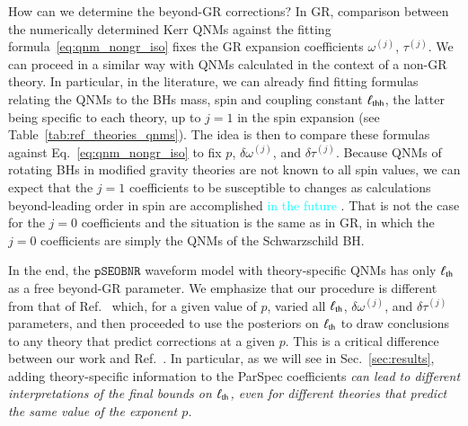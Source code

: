\documentclass[twocolumn,
               prd,
               aps,
               superscriptaddress,
               tightenlines,
               nofootinbib,
               eqsecnum,
               amsfonts,
               amsmath,
               longbibliography]{revtex4-1}
\newcommand{\pSEOB}{\texttt{pSEOBNR}}
\newcommand{\ab}[1]{{\textcolor{cyan}{{#1}} }}
\begin{document}
How can we determine the beyond-GR corrections? In GR, comparison between the numerically determined
Kerr QNMs against the fitting formula~\eqref{eq:qnm_nongr_iso} fixes the GR expansion coefficients
$\omega^{(j)}$, $\tau^{(j)}$.
%
We can proceed in a similar way with QNMs calculated in the context of a non-GR theory.
%
In particular, in the literature, we can already find fitting formulas relating
the QNMs to the BHs mass, spin and coupling constant $\ell_{\rm thh}$, the latter being
specific to each theory, up to $j=1$ in the spin expansion (see Table~\ref{tab:ref_theories_qnms}).
%
The idea is then to compare these formulas against Eq.~\eqref{eq:qnm_nongr_iso}
to fix $p$, $\delta\omega^{(j)}$, and $\delta\tau^{(j)}$.
%
Because QNMs of rotating BHs in modified gravity theories are not known to
all spin values, we can expect that the $j=1$ coefficients to be susceptible to
changes as calculations beyond-leading order in spin are accomplished \ab{in the future}.
%
That is not the case for the $j=0$ coefficients and the situation is the same as in GR,
in which the $j=0$ coefficients are simply the QNMs of the Schwarzschild BH.

In the end, the $\pSEOB$ waveform model with theory-specific
QNMs has only $\ell_{\rm th}$ as a free beyond-GR parameter.
%
We emphasize that our procedure is different from that of
Ref.~\cite{Carullo:2021dui} which, for a given value of $p$, varied all $\ell_{\rm th}$,
$\delta\omega^{(j)}$, and $\delta\tau^{(j)}$ parameters, and then proceeded
to use the posteriors on $\ell_{\rm th}$ to draw conclusions to any theory that predict
corrections at a given $p$.
%
This is a critical difference between our work and Ref.~\cite{Carullo:2021dui}.
In particular, as we will see in Sec.~\ref{sec:results}, adding theory-specific
information to the ParSpec coefficients \emph{can lead to different interpretations
of the final bounds on $\ell_{\rm th}$, even for different theories that predict the same 
value of the exponent $p$.}
\end{document}
